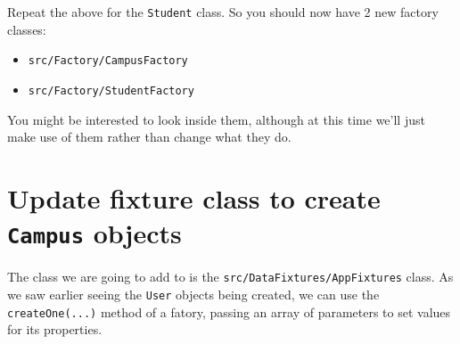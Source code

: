 \documentclass[a4paperpaper,openright]{book}
\newenvironment{Shaded}{}{}
\newcommand{\ExtensionTok}[1]{#1}
\newcommand{\NormalTok}[1]{#1}
\newcommand{\OperatorTok}[1]{\textcolor[rgb]{0.40,0.40,0.40}{#1}}
\providecommand{\tightlist}{%
  \setlength{\itemsep}{0pt}\setlength{\parskip}{0pt}}
\begin{document}
\begin{Shaded}
\end{Shaded}

Repeat the above for the \texttt{Student} class. So you should now have
2 new factory classes:

\begin{itemize}
\tightlist
\item
  \texttt{src/Factory/CampusFactory}
\item
  \texttt{src/Factory/StudentFactory}
\end{itemize}

You might be interested to look inside them, although at this time we'll
just make use of them rather than change what they do.

\hypertarget{update-fixture-class-to-create-campus-objects}{%
\section{\texorpdfstring{Update fixture class to create \texttt{Campus}
objects}{Update fixture class to create Campus objects}}\label{update-fixture-class-to-create-campus-objects}}

The class we are going to add to is the
\texttt{src/DataFixtures/AppFixtures} class. As we saw earlier seeing
the \texttt{User} objects being created, we can use the
\texttt{createOne(...)} method of a fatory, passing an array of
parameters to set values for its properties.
\end{document}
